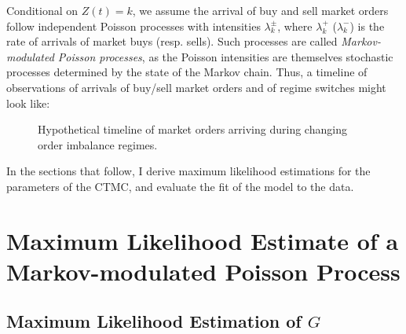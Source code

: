 Conditional on $Z(t) = k$, we assume the arrival of buy and sell market orders follow independent Poisson processes with intensities $\lambda_k^\pm$, where $\lambda_k^+$ ($\lambda_k^-$) is the rate of arrivals of market buys (resp. sells). Such processes are called \textit{Markov-modulated Poisson processes}, as the Poisson intensities are themselves stochastic processes determined by the state of the Markov chain. Thus, a timeline of observations of arrivals of buy/sell market orders and of regime switches might look like:
\begin{figure}
  
\caption{Hypothetical timeline of market orders arriving during changing order imbalance regimes.}
\label{introtimeline}
\end{figure}

In the sections that follow, I derive maximum likelihood estimations for the parameters of the CTMC, and evaluate the fit of the model to the data.

\section{Maximum Likelihood Estimate of a Markov-modulated Poisson Process}

\subsection{Maximum Likelihood Estimation of \texorpdfstring{$G$}{G}}

